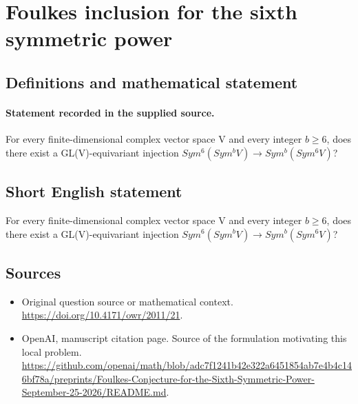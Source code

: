 \documentclass[11pt]{article}
\begin{document}
\section*{Foulkes inclusion for the sixth symmetric power}\label{statement}
\subsection{Definitions and mathematical statement}
\paragraph{Statement recorded in the supplied source.}
For every finite-dimensional complex vector space V and every integer $b\geq 6$, does there exist a GL(V)-equivariant injection $Sym^{6}(Sym^{b}V)\to Sym^{b}(Sym^{6}V)$?
\subsection{Short English statement}
For every finite-dimensional complex vector space V and every integer $b\geq 6$, does there exist a GL(V)-equivariant injection $Sym^{6}(Sym^{b}V)\to Sym^{b}(Sym^{6}V)$?
\subsection{Sources}
\begin{itemize}
\item[S1] Original question source or mathematical context.
\url{https://doi.org/10.4171/owr/2011/21}.
\item[S2] OpenAI, manuscript citation page. Source of the formulation motivating this local problem.
\url{https://github.com/openai/math/blob/adc7f1241b42e322a6451854ab7e4b4c146bf78a/preprints/Foulkes-Conjecture-for-the-Sixth-Symmetric-Power-September-25-2026/README.md}.
\end{itemize}
\end{document}
